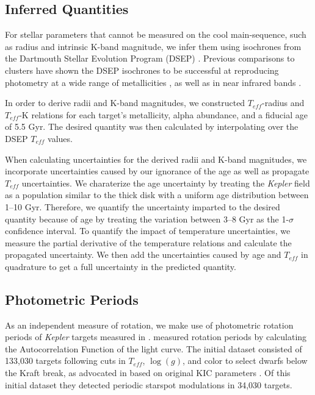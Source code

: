 \documentclass[manuscript]{aastex6}
\newcommand{\Kepler}{\mbox{\textit{Kepler}}}
\newcommand{\Teff}{\ensuremath{T_{eff}}}
\newcommand{\logg}{\ensuremath{\log(g)}}
\begin{document}
\subsection{Inferred Quantities}

For stellar parameters that cannot be measured on the cool main-sequence, such
as radius and intrinsic K-band magnitude, we infer them using isochrones from
the Dartmouth Stellar Evolution Program (DSEP) \citep{Dotter08}. Previous
comparisons to clusters have shown the DSEP isochrones to be successful at
reproducing photometry at a wide range of metallicities \citep{Dotter07}, as
well as in near infrared bands \citep{Sarajedini09}.

In order to derive radii and K-band magnitudes, we constructed \Teff-radius and
\Teff-K relations for each target's metallicity, alpha abundance, and a
fiducial age of 5.5 Gyr. The desired quantity was then calculated by
interpolating over the DSEP \Teff{} values.

When calculating uncertainties for the derived radii and K-band magnitudes, we
incorporate uncertainties caused by our ignorance of the age as well as
propagate \Teff{} uncertainties. We charaterize the age uncertainty by treating
the \Kepler{} field as a population similar to the thick disk with a uniform
age distribution between 1--10 Gyr. Therefore, we quantify the uncertainty
imparted to the desired quantity because of age by treating the variation
between 3--8 Gyr as the 1-\(\sigma\) confidence interval. To quantify the
impact of temperature uncertainties, we measure the partial derivative of the
temperature relations and calculate the propagated uncertainty. We then add the
uncertainties caused by age and \Teff{} in quadrature to get a full uncertainty
in the predicted quantity.

\subsection{Photometric Periods}

As an independent measure of rotation, we make use of photometric rotation
periods of \Kepler{} targets measured in \citet{McQuillan14}.
\citet{McQuillan14} measured rotation periods by calculating the 
Autocorrelation Function of the light curve. The initial dataset 
consisted of 133,030 targets following cuts in \Teff, \logg, and color to
select dwarfs below the Kraft break, as advocated in 
\citet{Ciardi11} based on original KIC parameters \citep{Brown11}. Of this
initial dataset they detected periodic starspot modulations in 34,030 targets.
\end{document}
